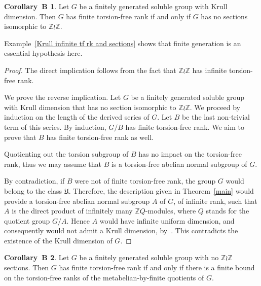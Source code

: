 \documentclass[11pt]{article}
\theoremstyle{definition}
\newcommand{\enoncename}{}
\newtheorem{corpusenonce}[theo]{\enoncename}
\newenvironment{enonce}[1]{\renewcommand{\enoncename}{#1}\begin{corpusenonce}}{\end{corpusenonce}}
\numberwithin{equation}{section}
\numberwithin{figure}{section}
\numberwithin{table}{section}
\newtheorem{corob}{Corollary~B\!}
\newcommand{\Z}{\mathbb{Z}}
\begin{document}
\begin{corob}\label{corob1}
Let $G$ be a finitely generated soluble group with Krull dimension. Then $G$ has finite torsion-free rank if and only if $G$ has no sections isomorphic to $\Z\wr\Z$.
\end{corob}
Example~\ref{Krull infinite tf rk and sections} shows that finite generation is an essential hypothesis here.
\begin{proof}
The direct implication follows from the fact that $\Z \wr \Z$ has infinite torsion-free rank.

We prove the reverse implication. Let $G$ be a finitely generated soluble group with Krull dimension that has no section isomorphic to $\Z \wr \Z$. We proceed by induction on the length of the derived series of $G$. Let $B$ be the last non-trivial term of this series. By induction, $G/B$ has finite torsion-free rank. We aim to prove that $B$ has finite torsion-free rank as well.

Quotienting out the torsion subgroup of $B$ has no impact on the torsion-free rank, thus we may assume that $B$ is a torsion-free abelian normal subgroup of $G$.

By contradiction, if $B$ were not of finite torsion-free rank, the group $G$ would belong to the class $\mathfrak{U}$. Therefore, the description given in Theorem~\ref{main} would provide a torsion-free abelian normal subgroup $A$ of $G$, of infinite rank, such that $A$ is the direct product of infinitely many $\Z Q$-modules, where $Q$ stands for the quotient group $G/A$. Hence $A$ would have infinite uniform dimension, and consequently would not admit a Krull dimension, by~\cite[6.2.6]{MR}. This contradicts the existence of the Krull dimension of $G$.
\end{proof}

\begin{corob}\label{corob2}
Let $G$ be a finitely generated soluble group with no $\Z\wr\Z$ sections. Then $G$ has finite torsion-free rank if and only if there is a finite bound on the torsion-free ranks of the metabelian-by-finite quotients of $G$.
\end{corob}
\end{document}
